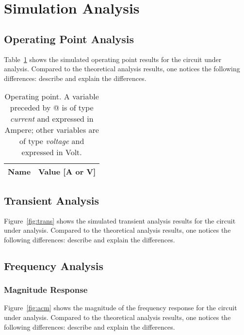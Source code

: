 \section{Simulation Analysis}
\label{sec:simulation}

\subsection{Operating Point Analysis}

Table~\ref{tab:op} shows the simulated operating point results for the circuit
under analysis. Compared to the theoretical analysis results, one notices the
following differences: describe and explain the differences.

\begin{table}[h]
  \centering
  \begin{tabular}{|l|r|}
    \hline    
    {\bf Name} & {\bf Value [A or V]} \\ \hline
    
  \end{tabular}
  \caption{Operating point. A variable preceded by @ is of type {\em current}
    and expressed in Ampere; other variables are of type {\it voltage} and expressed in
    Volt.}
  \label{tab:op}
\end{table}

\lipsum[1-1]


\subsection{Transient Analysis}

Figure~\ref{fig:trans} shows the simulated transient analysis results for the
circuit under analysis. Compared to the theoretical analysis results, one
notices the following differences: describe and explain the differences.


\lipsum[1-1]



\subsection{Frequency Analysis}

\subsubsection{Magnitude Response}

Figure~\ref{fig:acm} shows the magnitude of the frequency response for the
circuit under analysis. Compared to the theoretical analysis results, one
notices the following differences: describe and explain the differences.

